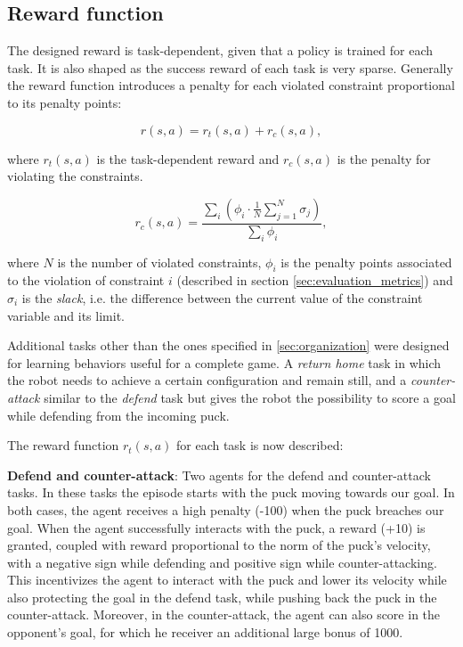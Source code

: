 \subsection{Reward function}
\label{subseq:reward}
The designed reward is task-dependent, given that a policy is trained for each task. It is also shaped as the success reward of each task is very sparse.
Generally the reward function introduces a penalty for each violated constraint proportional to its penalty points:

\begin{equation}
    r(s,a) = r_t(s,a) + r_c(s,a),
\end{equation}

where $r_t(s,a)$ is the task-dependent reward and $r_c(s,a)$ is the penalty for violating the constraints.

\begin{equation}
    r_c(s,a) = \frac{\sum_i \left(\phi_i \cdot \frac{1}{N} \sum_{j=1}^N \sigma_j\right)}{\sum_i \phi_i},
\end{equation}

where $N$ is the number of violated constraints, $\phi_i$ is the penalty points associated to the violation of constraint $i$
(described in section \ref{sec:evaluation_metrics}) and $\sigma_i$ is the \textit{slack}, i.e. the difference between the current value
of the constraint variable and its limit.

Additional tasks other than the ones specified in \ref{sec:organization} were designed for learning behaviors useful for a complete game. A \textit{return home} task in which the robot needs to achieve a certain configuration and remain still,
and a \textit{counter-attack} similar to the \textit{defend} task but gives the robot the possibility to score a goal while defending from the incoming puck.

The reward function $r_t(s,a)$ for each task is now described:

\textbf{Defend and counter-attack}: 
Two agents for the defend and counter-attack tasks. In these
tasks the episode starts with the puck moving towards our goal. In both cases, the agent receives a
high penalty (-100) when the puck breaches our goal. When the agent successfully interacts with the
puck, a reward (+10) is granted, coupled with reward proportional to the norm of the puck's velocity,
with a negative sign while defending and positive sign while counter-attacking. This incentivizes the
agent to interact with the puck and lower its velocity while also protecting the goal in the defend task,
while pushing back the puck in the counter-attack. Moreover, in the counter-attack, the agent can also
score in the opponent's goal, for which he receiver an additional large bonus of 1000.

